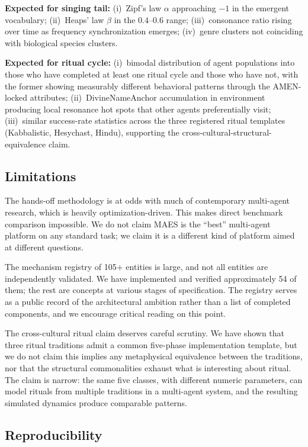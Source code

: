\documentclass[11pt,a4paper]{article}
\begin{document}
\textbf{Expected for singing tail:} (i)~Zipf's law $\alpha$ approaching
$-1$ in the emergent vocabulary; (ii)~Heaps' law $\beta$ in the
$0.4$--$0.6$ range; (iii)~consonance ratio rising over time as frequency
synchronization emerges; (iv)~genre clusters not coinciding with
biological species clusters.

\textbf{Expected for ritual cycle:} (i)~bimodal distribution of agent
populations into those who have completed at least one ritual cycle and
those who have not, with the former showing measurably different
behavioral patterns through the AMEN-locked attributes;
(ii)~DivineNameAnchor accumulation in environment producing local
resonance hot spots that other agents preferentially visit;
(iii)~similar success-rate statistics across the three registered
ritual templates (Kabbalistic, Hesychast, Hindu), supporting the
cross-cultural-structural-equivalence claim.

\subsection{Limitations}

The hands-off methodology is at odds with much of contemporary
multi-agent research, which is heavily optimization-driven. This makes
direct benchmark comparison impossible. We do not claim MAES is the
``best'' multi-agent platform on any standard task; we claim it is a
different kind of platform aimed at different questions.

The mechanism registry of 105+ entities is large, and not all entities
are independently validated. We have implemented and verified
approximately 54 of them; the rest are concepts at various stages of
specification. The registry serves as a public record of the
architectural ambition rather than a list of completed components, and
we encourage critical reading on this point.

The cross-cultural ritual claim deserves careful scrutiny. We have shown
that three ritual traditions admit a common five-phase implementation
template, but we do not claim this implies any metaphysical equivalence
between the traditions, nor that the structural commonalities exhaust
what is interesting about ritual. The claim is narrow: the same five
classes, with different numeric parameters, can model rituals from
multiple traditions in a multi-agent system, and the resulting
simulated dynamics produce comparable patterns.

\subsection{Reproducibility}
\end{document}
